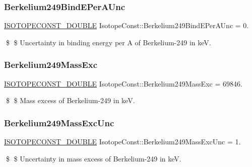 \subsubsection{\texorpdfstring{Berkelium249\+Bind\+E\+Per\+A\+Unc}{Berkelium249BindEPerAUnc}}
{\footnotesize\ttfamily \mbox{\hyperlink{group___isotope_const-_macros_ga8f45a7272ce02c0b4c65c44636ed719a}{I\+S\+O\+T\+O\+P\+E\+C\+O\+N\+S\+T\+\_\+\+D\+O\+U\+B\+LE}} Isotope\+Const\+::\+Berkelium249\+Bind\+E\+Per\+A\+Unc = 0.}

\$ \$ Uncertainty in binding energy per A of Berkelium-\/249 in keV. \mbox{\label{group___isotope_const-_berkelium-_bk249_ga3584127ab76b7689774bc95fba921f1f}} 
\subsubsection{\texorpdfstring{Berkelium249\+Mass\+Exc}{Berkelium249MassExc}}
{\footnotesize\ttfamily \mbox{\hyperlink{group___isotope_const-_macros_ga8f45a7272ce02c0b4c65c44636ed719a}{I\+S\+O\+T\+O\+P\+E\+C\+O\+N\+S\+T\+\_\+\+D\+O\+U\+B\+LE}} Isotope\+Const\+::\+Berkelium249\+Mass\+Exc = 69846.}

\$ \$ Mass excess of Berkelium-\/249 in keV. \mbox{\label{group___isotope_const-_berkelium-_bk249_gae4c1bdd58e26018bb1619ef45d695c3b}} 
\subsubsection{\texorpdfstring{Berkelium249\+Mass\+Exc\+Unc}{Berkelium249MassExcUnc}}
{\footnotesize\ttfamily \mbox{\hyperlink{group___isotope_const-_macros_ga8f45a7272ce02c0b4c65c44636ed719a}{I\+S\+O\+T\+O\+P\+E\+C\+O\+N\+S\+T\+\_\+\+D\+O\+U\+B\+LE}} Isotope\+Const\+::\+Berkelium249\+Mass\+Exc\+Unc = 1.}

\$ \$ Uncertainty in mass excess of Berkelium-\/249 in keV. \mbox{\label{group___isotope_const-_berkelium-_bk249_ga6d6f03c334651705b21a7a8426d7acc2}} 
